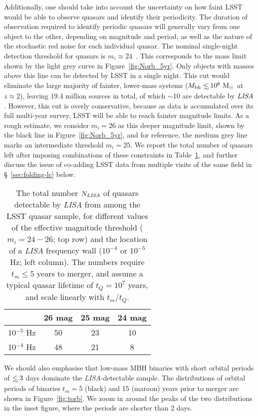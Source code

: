 \documentclass[fleqn,usenatbib]{mnras}
\newcommand\lsim{\mathrel{\rlap{\lower4pt\hbox{\hskip1pt$\sim$}}
        \raise1pt\hbox{$<$}}}
\begin{document}
Additionally, one should take into account the uncertainty on how faint LSST would be able to observe quasars and identify their periodicity. 
The duration of observation required to identify periodic quasars will generally vary from one object to the other, depending on magnitude and period, as well as the nature of the stochastic red noise for each individual quasar. 
The nominal single-night detection threshold for quasars is $m_i\approx 24$~\citep{LSSTScienceCollaboration2009}. This corresponds to the mass limit shown by the light grey curve in Figure~\ref{fig:Norb_5yr}. Only objects with masses above this line can be detected by LSST in a single night. This cut would eliminate the large majority of fainter, lower-mass systems ($M_{\rm bh}\lsim 10^6~{\rm M_\odot}$ at $z\approx 2$), leaving 19.4 million sources in total, of which $\sim$10 are detectable by ${\it LISA}$.
However, this cut is overly conservative, because as data is accumulated over its full multi-year survey, LSST will be able to reach fainter magnitude limits.  As a rough estimate, we consider $m_i=26$ as this deeper magnitude limit, shown by the black line in Figure~\ref{fig:Norb_5yr}, and for reference, the medium grey line marks an intermediate threshold $m_i=25$.   
We report the total number of quasars left after imposing combinations of these  constraints in Table~\ref{Table:Norb_pairs}, and further discuss the issue of co-adding LSST data from multiple visits of the same field in \S~\ref{sec:folding-lc} below. 

\begin{table}
    \centering
    \begin{tabular}{c|ccc}
    & 26 mag & 25 mag & 24 mag \\ \hline
    10$^{-5}$ Hz & 50 & 23 & 10 \\
    10$^{-4}$ Hz & 48 & 21 & 8 \\
    \end{tabular}
\caption{The total number $N_{\it LISA}$ of quasars detectable by {\it LISA} from among the LSST quasar sample, for different values of the effective magnitude threshold ($m_i=24-26$; top row)
and the location of a {\it LISA} frequency wall ($10^{-4}$ or $10^{-5}$ Hz; left column). The numbers require $t_m\leq 5$ years to merger, and assume a typical quasar lifetime of $t_Q=10^7$ years, and scale linearly with $t_m/t_Q$.}
    \label{Table:Norb_pairs}
\end{table}

We should also emphasise that low-mass MBH binaries with short orbital periods of $\lsim 3$ days dominate the {\it LISA}-detectable sample.
The distributions of orbital periods of binaries $t_m=5$ (black) and 15 (maroon) years prior to merger are shown in Figure~\ref{fig:torb}. We zoom in around the peaks of the two distributions in the inset figure, where the periods are shorter than 2 days. 
\end{document}
